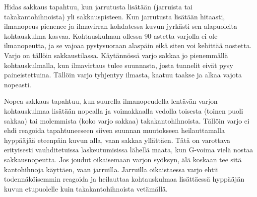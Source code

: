 Hidas sakkaus tapahtuu, kun jarrutusta lisätään (jarruista tai takakantohihnoista) yli sakkauspisteen. Kun jarrutusta lisätään hitaasti, ilmanopeus pienenee ja ilmavirran kohdatessa kuvun jyrkästi sen alapuolelta kohtauskulma kasvaa. Kohtauskulman ollessa 90 astetta varjolla ei ole ilmanopeutta, ja se vajoaa pystysuoraan alaspäin eikä siten voi kehittää nostetta. Varjo on tällöin sakkaustilassa. Käytännössä varjo sakkaa jo pienemmällä kohtauskulmalla, kun ilmavirtaus tulee suunnasta, josta tunnelit eivät pysy paineistettuina. Tällöin varjo tyhjentyy ilmasta, kaatuu taakse ja alkaa vajota nopeasti. 


Nopea sakkaus tapahtuu, kun suurella ilmanopeudella lentävän varjon kohtauskulmaa lisätään nopealla ja voimakkaalla vedolla toisesta (toinen puoli sakkaa) tai molemmista (koko varjo sakkaa) takakantohihnoista. Tällöin varjo ei ehdi reagoida tapahtuneeseen siiven suunnan muutokseen heilauttamalla hyppääjää eteenpäin kuvun alla, vaan sakkaa yllättäen. Tätä on varottava erityisesti vauhditetuissa laskeutumisissa lähellä maata, kun G-voima vielä nostaa sakkausnopeutta. Jos joudut oikaisemaan varjon syöksyn, älä koskaan tee sitä kantohihnoja käyttäen, vaan jarruilla. Jarruilla oikaistaessa varjo ehtii todennäköisemmin reagoida ja heilauttaa kohtauskulmaa lisättäessä hyppääjän kuvun etupuolelle kuin takakantohihnoista vetämällä. 

